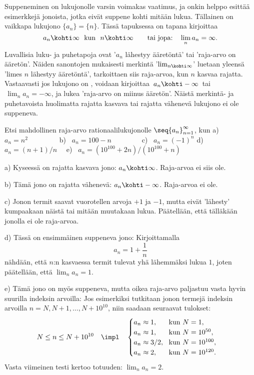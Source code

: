 Suppeneminen on lukujonolle varsin voimakas vaatimus, ja onkin helppo esittää esimerkkejä 
jonoista, jotka eivät suppene kohti mitään lukua. Tällainen on vaikkapa
%
 lukujono $\{a_n\} = \{n\}$. Tässä tapuksessa on tapana kirjoittaa
\[
a_n \kohti \infty\ \ \text{kun}\ \ n \kohti \infty \qquad 
                     \text{tai jopa:} \quad\lim_n a_n = \infty.
\]
Luvallisia luku- ja puhetapoja ovat '$a_n$ lähestyy ääretöntä' tai 'raja-arvo on ääretön'. 
Näiden sanontojen mukaisesti merkintä '$\lim_{n \kohti \infty}$' luetaan yleensä 
'limes $n$ lähestyy ääretöntä', tarkoittaen siis raja-arvoa, kun $n$ kasvaa rajatta.
Vastaavasti jos lukujono on
%
, voidaan kirjoittaa 
$\,a_n \kohti - \infty\,$ tai $\,\lim_n a_n = - \infty$, ja lukea 'raja-arvo on miinus 
ääretön'. Näistä merkintä- ja puhetavoista huolimatta rajatta kasvava tai rajatta vähenevä
lukujono ei ole suppeneva.
\begin{Exa} \label{jonoja} Etsi mahdollinen raja-arvo rationaalilukujonolle
$\seq{a_n}_{n=1}^\infty$, kun \vspace{1mm}\newline
a) \ $a_n = n^2 \qquad\qquad\,$ 
b) \ $a_n = 100-n \qquad\qquad$ 
c) \ $a_n = (-1)^n$ \vspace{1mm}\newline
d) \ $a_n = (n+1)/n \quad$
e) \ $a_n = (10^{100}+ 2n)/(10^{100} + n)$
\end{Exa}
\ratk a) Kyseessä on rajatta kasvava jono: $a_n \kohti \infty$. Raja-arvoa ei siis ole.

b) Tämä jono on rajatta vähenevä: $a_n \kohti - \infty$. Raja-arvoa ei ole.

c) Jonon termit saavat vuorotellen arvoja $+1$ ja $-1$, mutta eivät 'lähesty' kumpaakaan näistä
tai mitään muutakaan lukua. Päätellään, että tälläkään jonolla ei ole raja-arvoa.

d) Tässä on ensimmäinen suppeneva jono: Kirjoittamalla
\[
a_n = 1+\frac{1}{n}
\]
nähdään, että $n$:n kasvaessa termit tulevat yhä lähemmäksi lukua $1$, joten päätellään, että 
$\lim_n a_n = 1$.

e) Tämä jono on myös suppeneva, mutta oikea raja-arvo paljastuu vasta hyvin suurilla indeksin
arvoilla: Jos esimerkiksi tutkitaan jonon termejä indeksin arvoilla 
$n = N, N+1,\ldots,N+10^{10}$, niin saadaan seuraavat tulokset:
\[
N \le n \le N + 10^{10} \quad \impl \quad \begin{cases}
                                          a_n \approx 1, \quad \ \ \text{kun}\ N = 1,        \\
                                          a_n \approx 1, \quad \ \ \text{kun}\ N = 10^{50},  \\
                                          a_n \approx 3/2,\ \      \text{kun}\ N = 10^{100}, \\
                                          a_n \approx 2, \quad \ \ \text{kun}\ N = 10^{120}.
                                          \end{cases}
\]
Vasta viimeinen testi kertoo totuuden: $\lim_n a_n = 2$. \loppu

